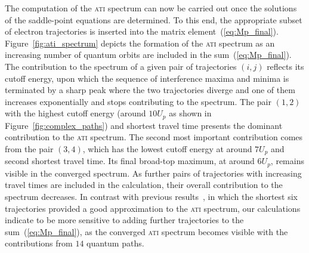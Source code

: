 
The computation of the \textsc{ati} spectrum can now be carried out
once the solutions of the saddle-point equations are determined. To
this end, the appropriate subset of electron trajectories is inserted
into the matrix
element~(\ref{eq:Mp_final}). Figure~\ref{fig:ati_spectrum} depicts the
formation of the \textsc{ati} spectrum as an increasing number of
quantum orbits are included in the sum~(\ref{eq:Mp_final}). The
contribution to the spectrum of a given pair of trajectories $(i,j)$
reflects its cutoff energy, upon which the sequence of interference
maxima and minima is terminated by a sharp peak where the two
trajectories diverge and one of them increases exponentially and stops
contributing to the spectrum. The pair $(1,2)$ with the highest cutoff
energy (around $10 U_{p}$ as shown in Figure~\ref{fig:complex_paths})
and shortest travel time presents the dominant contribution to the
\textsc{ati} spectrum. The second most important contribution comes
from the pair $(3,4)$, which has the lowest cutoff energy at around $7
U_{p}$ and second shortest travel time. Its final broad-top maximum,
at around $6 U_{p}$, remains visible in the converged spectrum. As
further pairs of trajectories with increasing travel times are
included in the calculation, their overall contribution to the
spectrum decreases. In contrast with previous
results~\cite{KopoldOptComm2000}, in which the shortest six
trajectories provided a good approximation to the \textsc{ati}
spectrum, our calculations indicate to be more sensitive to adding
further trajectories to the sum~(\ref{eq:Mp_final}), as the converged
\textsc{ati} spectrum becomes visible with the contributions from $14$
quantum paths.






